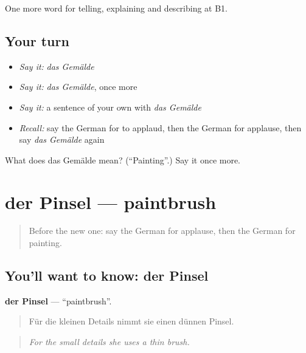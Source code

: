 \begin{grammarlens}[title={What you've built}]
One more word for telling, explaining and describing at B1.
\end{grammarlens}

\subsection*{Your turn}
\begin{itemize}
\raggedright
  \item \emph{Say it:} \emph{das Gemälde}
  \item \emph{Say it:} \emph{das Gemälde}, once more
  \item \emph{Say it:} a sentence of your own with \emph{das Gemälde}
  \item \emph{Recall:} say the German for to applaud, then the German for applause, then say \emph{das Gemälde} again
\end{itemize}

\begin{tcolorbox}[breakable,colback=teal!4,colframe=teal!35!black,title={Before you move on}]
What does das Gemälde mean? (\textquotedblleft{}Painting\textquotedblright{}.) Say it once more.
\end{tcolorbox}
\section[der Pinsel]{der Pinsel — paintbrush}

\label{lesson:GE-C518-pinsel}



\begin{quote}
Before the new one: say the German for applause, then the German for painting.
\end{quote}

\subsection*{You'll want to know: der Pinsel}
\textbf{der Pinsel} — \textquotedblleft{}paintbrush\textquotedblright{}.

\begin{quote}
Für die kleinen Details nimmt sie einen dünnen Pinsel.
\end{quote}

\begin{quote}
\emph{For the small details she uses a thin brush.}
\end{quote}

